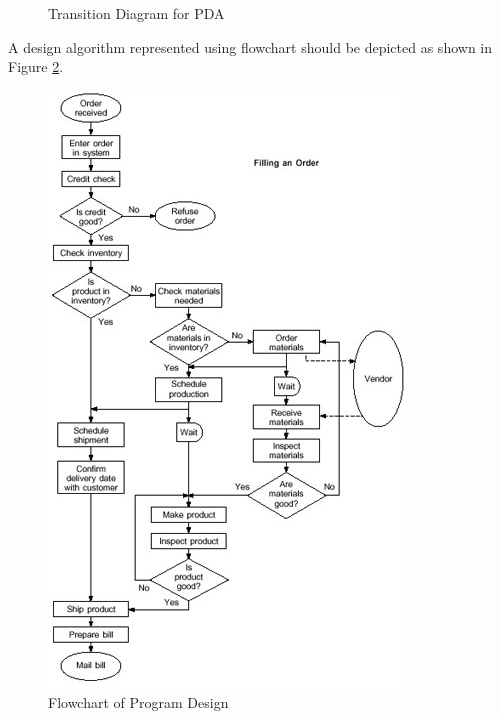 \begin{figure}[!h]
\centering
{}
\caption{Transition Diagram for PDA}
\label{PdaTrans}
\end{figure}



A design algorithm represented using flowchart should be depicted as shown in Figure \ref{flochartExample}.

\begin{figure}
\centering
\includegraphics[scale=0.8]{flowchart-fig2}
\caption{Flowchart of Program Design}
\label{flochartExample}
\end{figure}


